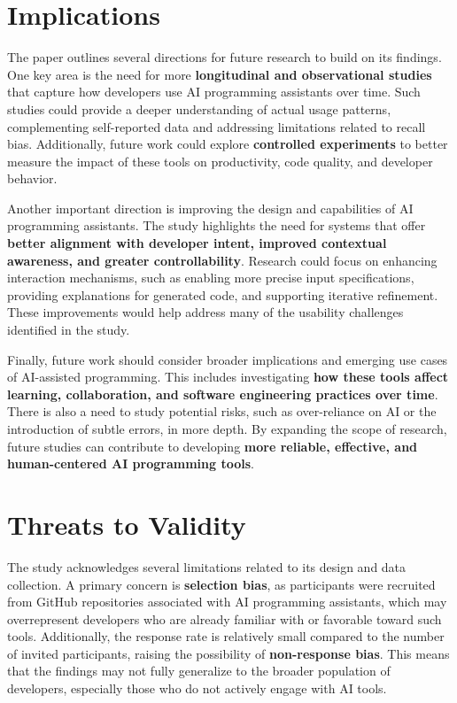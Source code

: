 \section{Implications}
The paper outlines several directions for future research to build on its findings. One key area is the need for more \textbf{longitudinal and observational studies} that capture how developers use AI programming assistants over time. Such studies could provide a deeper understanding of actual usage patterns, complementing self-reported data and addressing limitations related to recall bias. Additionally, future work could explore \textbf{controlled experiments} to better measure the impact of these tools on productivity, code quality, and developer behavior.

Another important direction is improving the design and capabilities of AI programming assistants. The study highlights the need for systems that offer \textbf{better alignment with developer intent, improved contextual awareness, and greater controllability}. Research could focus on enhancing interaction mechanisms, such as enabling more precise input specifications, providing explanations for generated code, and supporting iterative refinement. These improvements would help address many of the usability challenges identified in the study.

Finally, future work should consider broader implications and emerging use cases of AI-assisted programming. This includes investigating \textbf{how these tools affect learning, collaboration, and software engineering practices over time}. There is also a need to study potential risks, such as over-reliance on AI or the introduction of subtle errors, in more depth. By expanding the scope of research, future studies can contribute to developing \textbf{more reliable, effective, and human-centered AI programming tools}.

\section{Threats to Validity}
The study acknowledges several limitations related to its design and data collection. A primary concern is \textbf{selection bias}, as participants were recruited from GitHub repositories associated with AI programming assistants, which may overrepresent developers who are already familiar with or favorable toward such tools. Additionally, the response rate is relatively small compared to the number of invited participants, raising the possibility of \textbf{non-response bias}. This means that the findings may not fully generalize to the broader population of developers, especially those who do not actively engage with AI tools.

